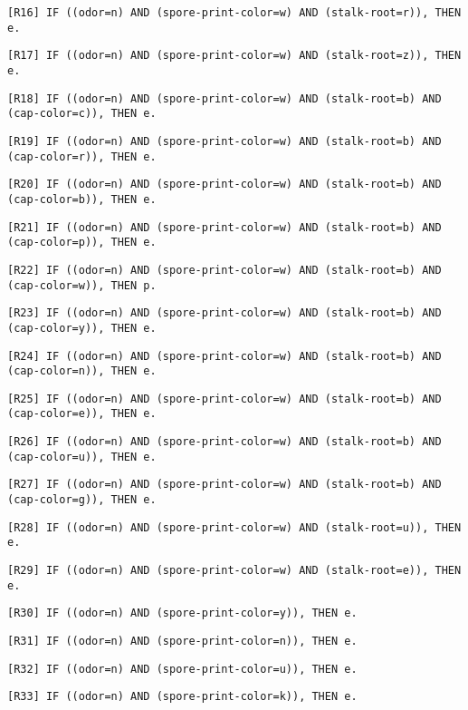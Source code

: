 \documentclass{IEEEtran}
\begin{document}
\texttt{[R16] IF ((odor=n) AND (spore-print-color=w) AND
  (stalk-root=r)), THEN e.}

\texttt{[R17] IF ((odor=n) AND (spore-print-color=w) AND (stalk-root=z)), THEN
e.}

\texttt{[R18] IF ((odor=n) AND (spore-print-color=w) AND (stalk-root=b) AND
(cap-color=c)), THEN e.}

\texttt{[R19] IF ((odor=n) AND (spore-print-color=w) AND (stalk-root=b) AND
(cap-color=r)), THEN e.}

\texttt{[R20] IF ((odor=n) AND (spore-print-color=w) AND (stalk-root=b) AND
(cap-color=b)), THEN e.}

\texttt{[R21] IF ((odor=n) AND (spore-print-color=w) AND (stalk-root=b) AND
(cap-color=p)), THEN e.}

\texttt{[R22] IF ((odor=n) AND (spore-print-color=w) AND (stalk-root=b) AND
(cap-color=w)), THEN p.}

\texttt{[R23] IF ((odor=n) AND (spore-print-color=w) AND (stalk-root=b) AND
(cap-color=y)), THEN e.}

\texttt{[R24] IF ((odor=n) AND (spore-print-color=w) AND (stalk-root=b) AND
(cap-color=n)), THEN e.}

\texttt{[R25] IF ((odor=n) AND (spore-print-color=w) AND (stalk-root=b) AND
(cap-color=e)), THEN e.}

\texttt{[R26] IF ((odor=n) AND (spore-print-color=w) AND (stalk-root=b) AND
(cap-color=u)), THEN e.}

\texttt{[R27] IF ((odor=n) AND (spore-print-color=w) AND (stalk-root=b) AND
(cap-color=g)), THEN e.}

\texttt{[R28] IF ((odor=n) AND (spore-print-color=w) AND (stalk-root=u)), THEN
e.}

\texttt{[R29] IF ((odor=n) AND (spore-print-color=w) AND (stalk-root=e)), THEN
e.}

\texttt{[R30] IF ((odor=n) AND (spore-print-color=y)), THEN e.}

\texttt{[R31] IF ((odor=n) AND (spore-print-color=n)), THEN e.}

\texttt{[R32] IF ((odor=n) AND (spore-print-color=u)), THEN e.}

\texttt{[R33] IF ((odor=n) AND (spore-print-color=k)), THEN e.}
\end{document}
